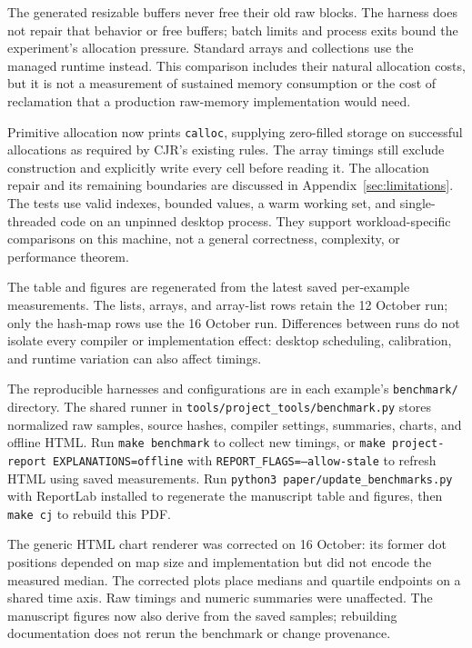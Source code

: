 The generated resizable buffers never free their old raw
blocks.  The harness does not repair that behavior or free buffers; batch
limits and process exits bound the experiment's allocation pressure.
Standard arrays and collections use the managed runtime instead.  This
comparison includes their natural allocation costs, but it is not a
measurement of sustained memory consumption or the cost of reclamation
that a production raw-memory implementation would need.

Primitive allocation now prints \texttt{calloc}, supplying zero-filled
storage on successful allocations as required by CJR's existing rules.
The array timings still exclude construction and explicitly write every
cell before reading it. The allocation repair and its remaining boundaries
are discussed in Appendix~\ref{sec:limitations}. The tests use valid indexes, bounded
values, a warm working set, and single-threaded code on an unpinned desktop
process.  They support workload-specific comparisons on this machine,
not a general correctness, complexity, or performance theorem.

The table and figures are regenerated from the latest saved per-example
measurements. The lists, arrays, and array-list rows retain the 12 October
run; only the hash-map rows use the 16 October run. Differences between
runs do not isolate every compiler or implementation effect: desktop
scheduling, calibration, and runtime variation can also affect timings.

The reproducible harnesses and configurations are in each example's
\texttt{benchmark/} directory. The shared runner in
\texttt{tools/project\_tools/benchmark.py} stores normalized raw samples,
source hashes, compiler settings, summaries, charts, and offline HTML.
Run \texttt{make benchmark} to collect new timings, or
\texttt{make project-report EXPLANATIONS=offline}
with \texttt{REPORT\_FLAGS=--allow-stale} to refresh HTML using
saved measurements. Run \texttt{python3 paper/update\_benchmarks.py}
with ReportLab installed to regenerate the manuscript table and figures,
then \texttt{make cj} to rebuild this PDF.

The generic HTML chart renderer was corrected on 16 October: its former
dot positions depended on map size and implementation but did not encode
the measured median. The corrected plots place medians and quartile
endpoints on a shared time axis. Raw timings and numeric summaries were
unaffected. The manuscript figures now also derive from the saved samples;
rebuilding documentation does not rerun the benchmark or change provenance.
